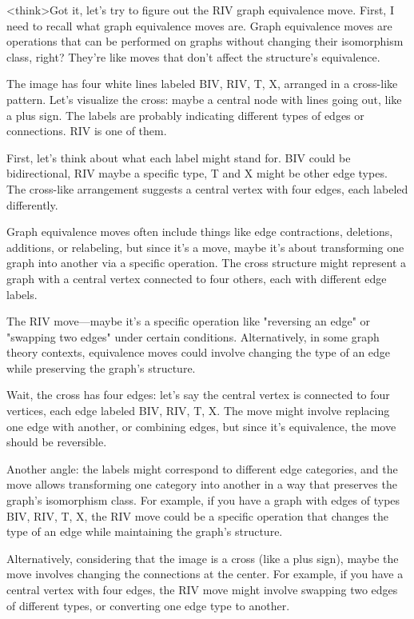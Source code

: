 <think>Got it, let's try to figure out the RIV graph equivalence move. First, I need to recall what graph equivalence moves are. Graph equivalence moves are operations that can be performed on graphs without changing their isomorphism class, right? They're like moves that don't affect the structure's equivalence.

The image has four white lines labeled BIV, RIV, T, X, arranged in a cross-like pattern. Let's visualize the cross: maybe a central node with lines going out, like a plus sign. The labels are probably indicating different types of edges or connections. RIV is one of them. 

First, let's think about what each label might stand for. BIV could be bidirectional, RIV maybe a specific type, T and X might be other edge types. The cross-like arrangement suggests a central vertex with four edges, each labeled differently. 

Graph equivalence moves often include things like edge contractions, deletions, additions, or relabeling, but since it's a move, maybe it's about transforming one graph into another via a specific operation. The cross structure might represent a graph with a central vertex connected to four others, each with different edge labels. 

The RIV move—maybe it's a specific operation like "reversing an edge" or "swapping two edges" under certain conditions. Alternatively, in some graph theory contexts, equivalence moves could involve changing the type of an edge while preserving the graph's structure. 

Wait, the cross has four edges: let's say the central vertex is connected to four vertices, each edge labeled BIV, RIV, T, X. The move might involve replacing one edge with another, or combining edges, but since it's equivalence, the move should be reversible. 

Another angle: the labels might correspond to different edge categories, and the move allows transforming one category into another in a way that preserves the graph's isomorphism class. For example, if you have a graph with edges of types BIV, RIV, T, X, the RIV move could be a specific operation that changes the type of an edge while maintaining the graph's structure. 

Alternatively, considering that the image is a cross (like a plus sign), maybe the move involves changing the connections at the center. For example, if you have a central vertex with four edges, the RIV move might involve swapping two edges of different types, or converting one edge type to another. 

